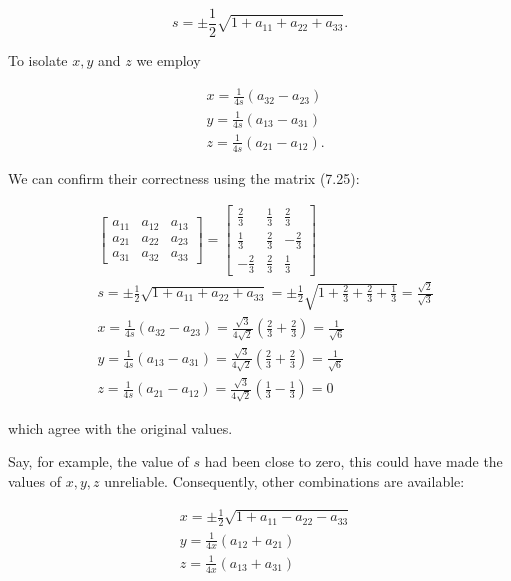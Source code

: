 $$
s=\pm \frac{1}{2} \sqrt{1+a_{11}+a_{22}+a_{33}} .
$$

To isolate $x, y$ and $z$ we employ

$$
\begin{aligned}
& x=\frac{1}{4 s}\left(a_{32}-a_{23}\right) \\
& y=\frac{1}{4 s}\left(a_{13}-a_{31}\right) \\
& z=\frac{1}{4 s}\left(a_{21}-a_{12}\right) .
\end{aligned}
$$

We can confirm their correctness using the matrix (7.25):

$$
\begin{aligned}
& \left[\begin{array}{lll}a_{11} & a_{12} & a_{13} \\a_{21} & a_{22} & a_{23} \\a_{31} & a_{32} & a_{33}\end{array}\right]=\left[\begin{array}{ccc}\frac{2}{3} & \frac{1}{3} & \frac{2}{3} \\\frac{1}{3} & \frac{2}{3} & -\frac{2}{3} \\-\frac{2}{3} & \frac{2}{3} & \frac{1}{3}\end{array}\right] \\
& s=\pm \frac{1}{2} \sqrt{1+a_{11}+a_{22}+a_{33}}=\pm \frac{1}{2} \sqrt{1+\frac{2}{3}+\frac{2}{3}+\frac{1}{3}}=\frac{\sqrt{2}}{\sqrt{3}} \\
& x=\frac{1}{4 s}\left(a_{32}-a_{23}\right)=\frac{\sqrt{3}}{4 \sqrt{2}}\left(\frac{2}{3}+\frac{2}{3}\right)=\frac{1}{\sqrt{6}} \\
& y=\frac{1}{4 s}\left(a_{13}-a_{31}\right)=\frac{\sqrt{3}}{4 \sqrt{2}}\left(\frac{2}{3}+\frac{2}{3}\right)=\frac{1}{\sqrt{6}} \\
& z=\frac{1}{4 s}\left(a_{21}-a_{12}\right)=\frac{\sqrt{3}}{4 \sqrt{2}}\left(\frac{1}{3}-\frac{1}{3}\right)=0
\end{aligned}
$$

which agree with the original values.

Say, for example, the value of $s$ had been close to zero, this could have made the values of $x, y, z$ unreliable. Consequently, other combinations are available:

$$
\begin{aligned}
& x=\pm \frac{1}{2} \sqrt{1+a_{11}-a_{22}-a_{33}} \\
& y=\frac{1}{4 x}\left(a_{12}+a_{21}\right) \\
& z=\frac{1}{4 x}\left(a_{13}+a_{31}\right)
\end{aligned}
$$

